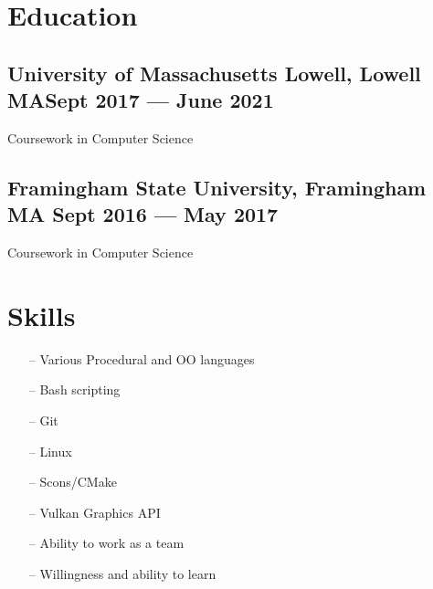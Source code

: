 \documentclass[11pt]{article}
\begin{document}
\section{Education}

\subsection{University of Massachusetts Lowell, Lowell MA\dotfill Sept 2017 --- June 2021}
{\hspace{-1em} Coursework in Computer Science}

\subsection{Framingham State University, Framingham MA \dotfill Sept 2016 --- May 2017} 
{\hspace{-1em}Coursework in Computer Science}

\section{Skills}
	\begin{multicols}{2}
		\noindent
		\vspace{-1em}
		\begin{itemize}[noitemsep, topsep=0pt]
			\item[--] Various Procedural and OO languages 
			\item[--] Bash scripting 
			\item[--] Git
			\item[--] Linux
			\item[--] Scons/CMake
			\item[--] Vulkan Graphics API
			\item[--] Ability to work as a team
			\item[--] Willingness and ability to learn
		\end{itemize}
	\end{multicols}
\end{document}
